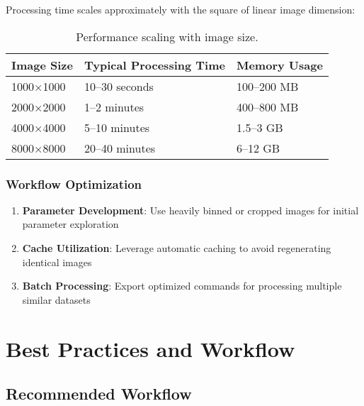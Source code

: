 \documentclass[11pt,a4paper]{article}
\begin{document}
Processing time scales approximately with the square of linear image
dimension:

\begin{table}[H]
\centering
\begin{tabular}{@{}lll@{}}
\toprule
Image Size & Typical Processing Time & Memory Usage \\
\midrule
1000×1000 & 10--30 seconds & 100--200 MB \\
2000×2000 & 1--2 minutes & 400--800 MB \\
4000×4000 & 5--10 minutes & 1.5--3 GB \\
8000×8000 & 20--40 minutes & 6--12 GB \\
\bottomrule
\end{tabular}
\caption{Performance scaling with image size.}
\label{tab:performance}
\end{table}

\subsubsection{Workflow Optimization}

\begin{enumerate}
\item \textbf{Parameter Development}: Use heavily binned or cropped images
for initial parameter exploration
\item \textbf{Cache Utilization}: Leverage automatic caching to avoid
regenerating identical images
\item \textbf{Batch Processing}: Export optimized commands for processing
multiple similar datasets
\end{enumerate}

\section{Best Practices and Workflow}

\subsection{Recommended Workflow}
\end{document}
